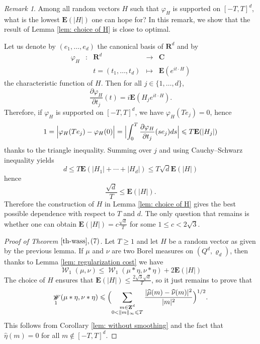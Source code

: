 \documentclass[12pt]{amsart}
\renewcommand{\mathcal}{\mathscr}
\newcommand{\Cc}{\mathbf{C}}
\newcommand{\Zz}{\mathbf{Z}}
\newcommand{\Rr}{\mathbf{R}}
\newcommand{\expect}{\mathbf{E}}
\renewcommand{\hat}{\widehat}
\DeclareMathOperator{\wass}{\mathcal{W}}
\renewcommand{\rho}{\varrho}
\theoremstyle{plain}
\theoremstyle{remark}
\newtheorem*{rem}{Remark}
\theoremstyle{definition}
\begin{document}
\begin{rem}
  Among all random vectors $H$ such that $\varphi_H$ is supported on
  $[-T,T]^d$, what is the lowest $\expect(|H|)$ one can hope for? In
  this remark, we show that the result of Lemma \ref{lem: choice of H}
  is close to optimal.

  Let us denote by $(e_1, \dots, e_d)$ the canonical basis of $\Rr^d$ and by
  $$
  \begin{array}{ccccc}
    \varphi_H & : & \Rr^d & \to & \Cc \\
              && t = (t_1, \dots, t_d) & \mapsto & \expect(e^{i t \cdot H})
  \end{array}
  $$ 
  the characteristic function of $H$. Then for all $j \in \{1, \dots, d\}$,
  $$
  \frac{\partial \varphi_H}{\partial t_j}(t) = i \expect(H_j e^{i t
    \cdot H}).
  $$
  Therefore, if $\varphi_H$ is supported on $[-T,T]^d$, we have $\varphi_H(Te_j) = 0$, hence
  $$
  1 = \Bigl| \varphi_H(Te_j) - \varphi_H(0)\Bigr| = \Bigl|
  \int_{0}^{T} \frac{\partial \varphi_H}{\partial t_j}(se_j)ds \Bigr|
  \leqslant T \expect(|H_j|)
  $$
  thanks to the triangle inequality. Summing over $j$ and using Cauchy--Schwarz inequality yields
  $$d \leqslant T  \expect(|H_1| + \cdots + |H_d|) \leqslant T \sqrt{d} \expect(|H|)$$ 
  hence 
  $$
  \frac{\sqrt{d}}{T} \leqslant  \expect(|H|).
  $$
  Therefore the construction of $H$ in Lemma \ref{lem: choice of H}
  gives the best possible dependence with respect to $T$ and $d$. The
  only question that remains is whether one can obtain
  $\expect(|H|) = c \frac{\sqrt{d}}{T}$ for some
  $1 \leqslant c < 2\sqrt{3}$.
\end{rem}


\begin{proof}[Proof of Theorem $\ref{th-wass}, (7)$]
  Let $T \geqslant 1$ and let $H$ be a random vector as given by the
  previous lemma. If $\mu$ and $\nu$ are two Borel measures on
  $(Q^d, \rho_d)$, then thanks to Lemma \ref{lem: regularization cost}
  we have
  $$
  \wass_1(\mu, \nu) \leqslant 	\wass_1(\mu* \eta, \nu * \eta) + 2 \expect(|H|) 
  $$
  The choice of $H$ ensures that $\expect(|H|) \leqslant \frac{2 \sqrt{3}\sqrt{d}}{T}$, so it just remains to prove that 
  $$
  \wass_1(\mu* \eta, \nu * \eta) \leqslant \Bigl(\sum_{\substack{m \in \Zz^d \\ 0 < \|m\|_{\infty} \leqslant T}} \frac{|\hat{\mu}(m) - \hat{\nu}(m)|^2}{|m|^2}\Bigr)^{1/2}.
  $$
  This follows from Corollary \ref{lem: without smoothing} and the
  fact that $\hat{\eta}(m) = 0$ for all $m \notin [-T,T]^d$.
\end{proof}



\end{document}
